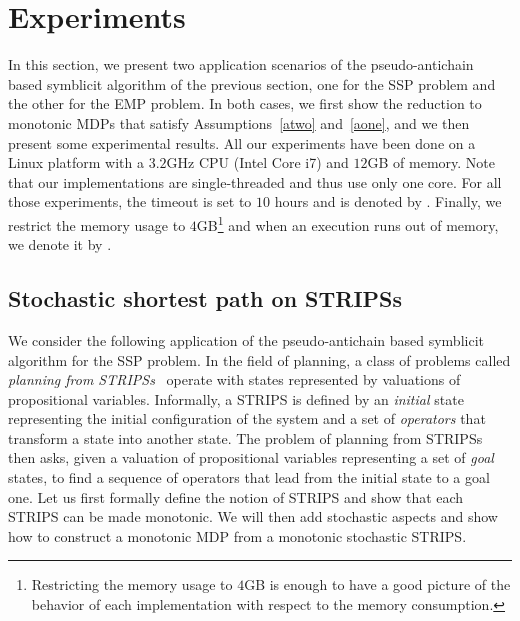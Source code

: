 \section{Experiments} \label{sec:experiments}
In this section, we present two application scenarios of the pseudo-antichain based symblicit algorithm of the previous section, one for the SSP problem and the other for the EMP problem. In both cases, we first show the reduction to monotonic MDPs that satisfy Assumptions~\ref{atwo} and~\ref{aone}, and we then present some experimental results. All our experiments have been done on a Linux platform with a $3.2$GHz CPU (Intel Core i7) and $12$GB of memory. Note that our implementations are single-threaded and thus use only one core. For all those experiments, the timeout is set to $10$ hours and is denoted by \timeout. Finally, we restrict the memory usage to $4$GB\footnote{Restricting the memory usage to $4$GB is enough to have a good picture of the behavior of each implementation with respect to the memory consumption.} and when an execution runs out of memory, we denote it by \memout.

\subsection{Stochastic shortest path on STRIPSs}
We consider the following application of the pseudo-antichain based symblicit algorithm for the SSP problem. In the field of planning, a class of problems called \textit{planning from STRIPSs}~\cite{fikes1972strips} operate with states represented by valuations of propositional variables. Informally, a STRIPS is defined by an \textit{initial} state representing the initial configuration of the system and a set of \textit{operators} that transform a state into another state. The problem of planning from STRIPSs then asks, given a valuation of propositional variables representing a set of \textit{goal} states, to find a sequence of operators that lead from the initial state to a goal one. Let us first formally define the notion of STRIPS and show that each STRIPS can be made monotonic. We will then add stochastic aspects and show how to construct a monotonic MDP from a monotonic stochastic STRIPS.

